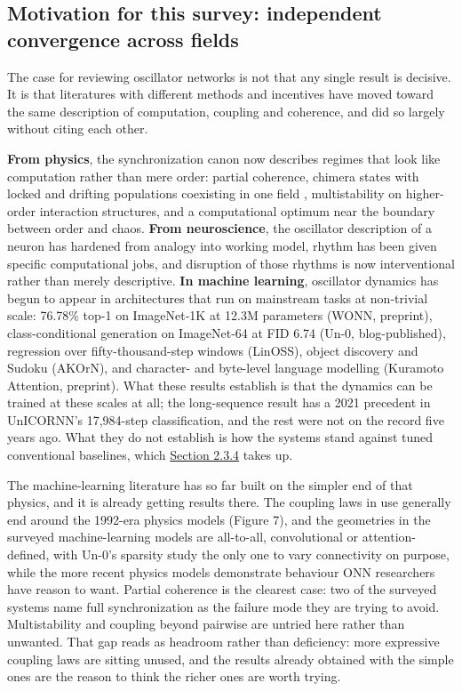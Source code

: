 \documentclass[a4paper,fleqn]{cas-sc}
\begin{document}
\subsection{Motivation for this survey: independent convergence across
fields}\label{sec-1-4}

The case for reviewing oscillator networks is not that any single result
is decisive. It is that literatures with different methods and
incentives have moved toward the same description of computation,
coupling and coherence, and did so largely without citing each other.

\textbf{From physics}, the synchronization canon now describes regimes
that look like computation rather than mere order: partial coherence,
chimera states with locked and drifting populations coexisting in one
field \citep{abrams2004}, multistability on higher-order interaction
structures, and a computational optimum near the boundary between order
and chaos. \textbf{From neuroscience}, the oscillator description of a
neuron has hardened from analogy into working model, rhythm has been
given specific computational jobs, and disruption of those rhythms is
now interventional rather than merely descriptive. \textbf{In machine
learning}, oscillator dynamics has begun to appear in architectures that
run on mainstream tasks at non-trivial scale: 76.78\% top-1 on
ImageNet-1K at 12.3M parameters (WONN, preprint), class-conditional
generation on ImageNet-64 at FID 6.74 (Un-0, blog-published), regression
over fifty-thousand-step windows (LinOSS), object discovery and Sudoku
(AKOrN), and character- and byte-level language modelling (Kuramoto
Attention, preprint). What these results establish is that the dynamics
can be trained at these scales at all; the long-sequence result has a
2021 precedent in UnICORNN's 17,984-step classification, and the rest
were not on the record five years ago. What they do not establish is how
the systems stand against tuned conventional baselines, which
\hyperref[sec-2-3-4]{Section 2.3.4} takes up.

The machine-learning literature has so far built on the simpler end of
that physics, and it is already getting results there. The coupling laws
in use generally end around the 1992-era physics models (Figure 7), and
the geometries in the surveyed machine-learning models are all-to-all,
convolutional or attention-defined, with Un-0's sparsity study the only
one to vary connectivity on purpose, while the more recent physics
models demonstrate behaviour ONN researchers have reason to want.
Partial coherence is the clearest case: two of the surveyed systems name
full synchronization as the failure mode they are trying to avoid.
Multistability and coupling beyond pairwise are untried here rather than
unwanted. That gap reads as headroom rather than deficiency: more
expressive coupling laws are sitting unused, and the results already
obtained with the simple ones are the reason to think the richer ones
are worth trying.
\end{document}
